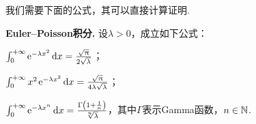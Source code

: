 \begin{solution}
  \begin{inparaenum}[(a)]
    \item 我们需要下面的公式，其可以直接计算证明.
  \end{inparaenum}
  \begin{mybox}
      {\bfseries Euler--Poisson积分.} 设$\lambda>0$，成立如下公式：
      \begin{enum}
        \item $\int_0^{+\infty}\operatorname{\!\!\;\mathrm e}^{-\lambda x^2}\mathop{}\!\mathrm d x=\frac{\sqrt{\uppi}}{2\sqrt{\lambda}}$；
        \item $\int_0^{+\infty}x^2\operatorname{\!\!\;\mathrm e}^{-\lambda x^2}\mathop{}\!\mathrm d x=\frac{\sqrt{\uppi}}{4\lambda\sqrt\lambda}$；
        \item\label{sol4.94c} $\int_0^{+\infty}\ee^{-\lambda x^n}\dif x=\frac{\Gamma\left(1+\frac1n
            \right)}{\sqrt[n]\lambda}$，其中$\Gamma$表示Gamma函数，$n\in\mathbb N$.
      \end{enum}
    \end{mybox}


\end{solution}

